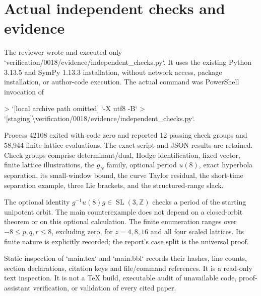 \documentclass[10pt]{article}
\begin{document}
\section*{Actual independent checks and evidence}
The reviewer wrote and executed only `verification/0018/evidence/independent\_checks.py`. It uses the existing Python 3.13.5 and SymPy 1.13.3 installation, without network access, package installation, or author-code execution. The actual command was PowerShell invocation of\par
> `[local archive path omitted] `-X utf8 -B`
> `[staging]\textbackslash{}verification/0018/evidence/independent\_checks.py`.\par
Process 42108 exited with code zero and reported 12 passing check groups and 58,944 finite lattice evaluations. The exact script and JSON results are retained. Check groups comprise determinant/dual, Hodge identification, fixed vector, finite lattice illustrations, the \(g_N\) family, optional period \(u(8)\), exact hyperbola separation, its small-window bound, the curve Taylor residual, the short-time separation example, three Lie brackets, and the structured-range slack.\par
The optional identity \(g^{-1}u(8)g\in\operatorname{SL}(3,\mathbb Z)\) checks a period of the starting unipotent orbit. The main counterexample does not depend on a closed-orbit theorem or on this optional calculation. The finite enumeration ranges over \(-8\leq p,q,r\leq8\), excluding zero, for \(z=4,8,16\) and all four scaled lattices. Its finite nature is explicitly recorded; the report’s case split is the universal proof.\par
Static inspection of `main.tex` and `main.bbl` records their hashes, line counts, section declarations, citation keys and file/command references. It is a read-only text inspection. It is not a TeX build, executable audit of unavailable code, proof-assistant verification, or validation of every cited paper.\par
\end{document}
